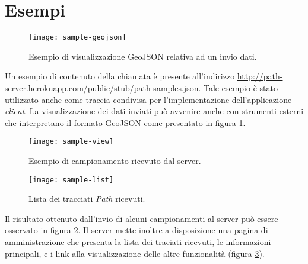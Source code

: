 \section{Esempi}
\begin{figure}[ht]
  \centering
  \texttt{[image: sample-geojson]}
  \caption{\footnotesize{Esempio di visualizzazione GeoJSON relativa ad un invio dati.}}
  \label{fig:sample-geojson}
\end{figure}
Un esempio di contenuto della chiamata è presente all'indirizzo \url{http://path-server.herokuapp.com/public/stub/path-samples.json}. Tale esempio è stato utilizzato anche come traccia condivisa per l'implementazione dell'applicazione \emph{client}. La visualizzazione dei dati inviati può avvenire anche con strumenti esterni che interpretano il formato GeoJSON come presentato in figura \ref{fig:sample-geojson}.

\begin{figure}[ht]
  \centering
  \texttt{[image: sample-view]}
  \caption{\footnotesize{Esempio di campionamento ricevuto dal server.}}
  \label{fig:sample-view}
\end{figure}

\begin{figure}[ht]
  \centering
  \texttt{[image: sample-list]}
  \caption{\footnotesize{Lista dei tracciati \emph{Path} ricevuti.}}
  \label{fig:sample-list}
\end{figure}
Il risultato ottenuto dall'invio di alcuni campionamenti al server può essere osservato in figura \ref{fig:sample-view}. Il server mette inoltre a disposizione una pagina di amministrazione che presenta la lista dei traciati ricevuti, le informazioni principali, e i link alla visualizzazione delle altre funzionalità (figura \ref{fig:sample-list}).
